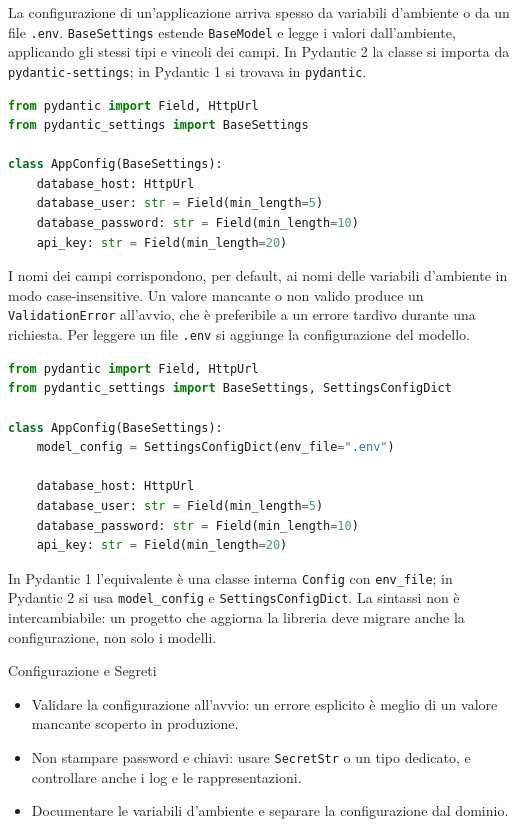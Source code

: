 \documentclass[12pt]{extarticle}
\begin{document}
\noindent La configurazione di un'applicazione arriva spesso da variabili d'ambiente o da un file \texttt{.env}. \texttt{BaseSettings} estende \texttt{BaseModel} e legge i valori dall'ambiente, applicando gli stessi tipi e vincoli dei campi. In Pydantic 2 la classe si importa da \texttt{pydantic-settings}; in Pydantic 1 si trovava in \texttt{pydantic}.

\begin{lstlisting}[language=Python]
from pydantic import Field, HttpUrl
from pydantic_settings import BaseSettings

class AppConfig(BaseSettings):
    database_host: HttpUrl
    database_user: str = Field(min_length=5)
    database_password: str = Field(min_length=10)
    api_key: str = Field(min_length=20)
\end{lstlisting}

\noindent I nomi dei campi corrispondono, per default, ai nomi delle variabili d'ambiente in modo case-insensitive. Un valore mancante o non valido produce un \texttt{ValidationError} all'avvio, che è preferibile a un errore tardivo durante una richiesta. Per leggere un file \texttt{.env} si aggiunge la configurazione del modello.

\begin{lstlisting}[language=Python]
from pydantic import Field, HttpUrl
from pydantic_settings import BaseSettings, SettingsConfigDict

class AppConfig(BaseSettings):
    model_config = SettingsConfigDict(env_file=".env")

    database_host: HttpUrl
    database_user: str = Field(min_length=5)
    database_password: str = Field(min_length=10)
    api_key: str = Field(min_length=20)
\end{lstlisting}

\noindent In Pydantic 1 l'equivalente è una classe interna \texttt{Config} con \texttt{env\_file}; in Pydantic 2 si usa \texttt{model\_config} e \texttt{SettingsConfigDict}. La sintassi non è intercambiabile: un progetto che aggiorna la libreria deve migrare anche la configurazione, non solo i modelli.

\begin{cbox}{Configurazione e Segreti}
\begin{itemize}
    \item Validare la configurazione all'avvio: un errore esplicito è meglio di un valore mancante scoperto in produzione.
    \item Non stampare password e chiavi: usare \texttt{SecretStr} o un tipo dedicato, e controllare anche i log e le rappresentazioni.
    \item Documentare le variabili d'ambiente e separare la configurazione dal dominio.
\end{itemize}
\end{cbox}
\end{document}
